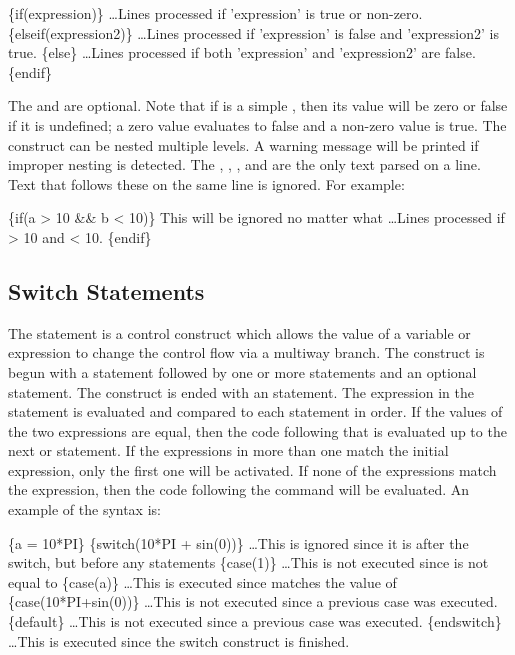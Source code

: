 \begin{apinp}
\{if(expression)\}
\ldots Lines processed if 'expression' is true or non-zero.
\{elseif(expression2)\}
\ldots Lines processed if 'expression' is false and 'expression2' is true.
\{else\}
\ldots Lines processed if both 'expression' and 'expression2' are false.
\{endif\}
\end{apinp}

The  and  are optional.  Note that if  is a simple , then its value will be zero or false if it is undefined; a zero value evaluates to false and a non-zero value is true. The  construct can be nested multiple levels.
A warning message will be printed if improper nesting is detected. The , 
, , and  are the 
only text parsed on a line. Text that follows these on the same line is
ignored.  For example:

\begin{apinp}
\{if(a > 10 && b < 10)\} This will be ignored no matter what
\ldots Lines processed if  > 10 and  < 10.
\{endif\}
\end{apinp}

\subsection{Switch Statements}
The  statement is a control construct which allows the value of a variable or expression to change the control flow via a multiway branch.
The construct is begun with a  statement followed by one or more  statements and an optional  statement. The construct is ended with an  statement.  The expression in the  statement is evaluated and compared to each  statement in order.  If the values of the two expressions are equal, then the code following that  is evaluated up to the next  or  statement. If the expressions in more than one  match the initial  expression, only the first one will be activated.  If none of the  expressions match the  expression, then the code following the  command will be evaluated. An example of the syntax is:

\begin{apinp}
\{a = 10*PI\}
\{switch(10*PI + sin(0))\}
\ldots This is ignored since it is after the switch, but before any  statements
\{case(1)\}
\ldots This is not executed since  is not equal to 
\{case(a)\}
\ldots This is executed since  matches the value of 
\{case(10*PI+sin(0))\}
\ldots This is not executed since a previous case was executed.
\{default\}
\ldots This is not executed since a previous case was executed.
\{endswitch\}
\ldots This is executed since the switch construct
 is finished.
\end{apinp}


